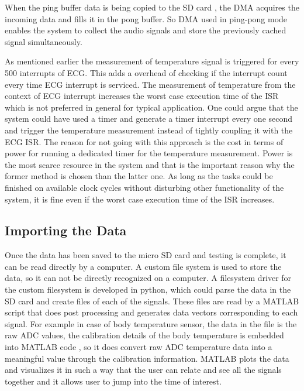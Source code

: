  When the ping buffer data is being copied to the SD card , the DMA acquires the incoming data and fills it in the pong buffer. So DMA used in ping-pong mode enables the system to collect the audio signals and store the previously cached signal simultaneously. 
 
 As mentioned earlier the measurement of temperature signal is triggered for every 500 interrupts of ECG. This adds a overhead of checking if the interrupt count every time ECG interrupt is serviced. The measurement of temperature from the context of ECG interrupt increases the worst case execution time of the ISR which is not preferred in general for typical application. One could argue that the system could have used a timer and generate a timer interrupt every one second and trigger the temperature measurement instead of tightly coupling it with the ECG ISR. The reason for not going with this approach is the cost in terms of power for running a dedicated timer for the temperature measurement. Power is the most scarce resource in the system and that is the important reason why the former method is chosen than the latter one. As long as the tasks could be finished on available clock cycles without disturbing other functionality of the system, it is fine even if the worst case execution time of the ISR increases.
 
\subsection{Importing the Data}
Once the data has been saved to the micro SD card and testing is complete, it can be read directly by a computer. A custom file system is used to store the data, so it can not be directly recognized on a computer. A filesystem driver for the custom filesystem is developed in python, which could parse the data in the SD card and create files of each of the signals. These files are read by a MATLAB script that does post processing and generates data vectors corresponding to each signal. For example in case of body temperature sensor, the data in the file is the raw ADC values, the calibration details of the body temperature is embedded into MATLAB code , so it does convert raw ADC temperature  data into a meaningful value through the calibration information.  
MATLAB plots the data and visualizes it in such a way that the user can relate and see all the signals together and it allows user to jump into the time of interest. 

